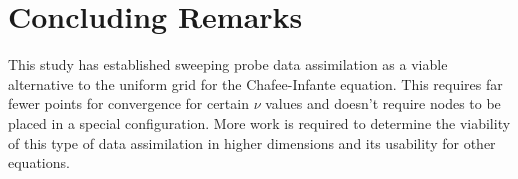 \documentclass[12pt]{amsart}
\theoremstyle{plain}
\theoremstyle{definition}
\theoremstyle{remark}
\numberwithin{equation}{section} %
\numberwithin{figure}{section}   %
\begin{document}
\section{Concluding Remarks}
This study has established sweeping probe data assimilation as a viable alternative to the uniform grid for the Chafee-Infante equation. This requires far fewer points for convergence for certain $\nu$ values and doesn't require nodes to be placed in a special configuration. More work is required to determine the viability of this type of data assimilation in higher dimensions and its usability for other equations. 
\clearpage
% 
%



\end{document}
